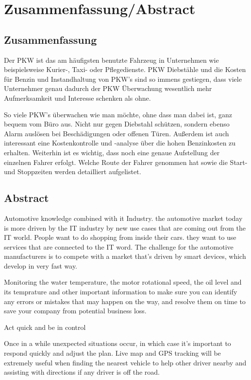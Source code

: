 \chapter{Zusammenfassung/Abstract}
    \section{Zusammenfassung}
       \hspace{1cm} Der PKW ist das am häufigsten benutzte Fahrzeug in Unternehmen wie beispielsweise Kurier-, Taxi- oder Pflegedienste. PKW Diebstähle und die Kosten für Benzin und Instandhaltung von PKW's sind so immens gestiegen, dass viele Unternehmer genau dadurch der PKW Überwachung wesentlich mehr Aufmerksamkeit und Interesse schenken als ohne. \newline

So viele PKW's überwachen wie man möchte, ohne dass man dabei ist, ganz bequem vom Büro aus. Nicht nur gegen Diebstahl schützen, sondern ebenso Alarm auslösen bei Beschädigungen oder offenen Türen. Außerdem ist auch interessant eine Kostenkontrolle und -analyse über die hohen Benzinkosten zu erhalten. Weiterhin ist es wichtig, dass noch eine genaue Aufstellung der einzelnen Fahrer erfolgt. Welche Route der Fahrer genommen hat sowie die Start- und Stoppzeiten werden detailliert aufgelistet. 

    \section{Abstract}

    Automotive knowledge combined with it Industry.
     the automotive market today is more driven by the IT industry by new use cases that are coming out from the IT world.
     People want to do shopping from inside their cars. they want to use services that are connected to the IT word. The challenge for the automotive manufacturers is to compete with a market that's driven by smart devices, which develop in very fast way.
     
    
Monitoring the water temperature, the motor rotational speed, the oil level and its temprature and other important information to make sure you can identify any errors or mistakes that may happen on the way, and resolve them on time to save your company from potential business loss.


    
Act quick and be in control

Once in a while unexpected situations occur, in which case it's important to respond quickly and adjust the plan. Live map and GPS tracking will be extremely useful when finding the nearest vehicle to help other driver nearby and assisting with directions if any driver is off the road.

